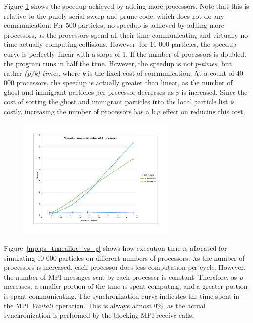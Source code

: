 \documentclass[11pt]{article} %
\begin{document}
Figure \ref{mpips_speedup_vs_p} shows the speedup achieved by adding more processors. Note that this is relative to the purely serial sweep-and-prune code, which does not do any communication. For 500 particles, no speedup is achieved by adding more processors, as the processors spend all their time communicating and virtually no time actually computing collisions. However, for 10 000 particles, the speedup curve is perfectly linear with a slope of 1. If the number of processors is doubled, the program runs in half the time. However, the speedup is not {\em p-times}, but rather {\em (p/k)-times}, where {\em k} is the fixed cost of communication. At a count of 40 000 processors, the speedup is actually greater than linear, as the number of ghost and immigrant particles per processor decreases as {\em p} is increased. Since the cost of sorting the ghost and immigrant particles into the local particle list is costly, increasing the number of processors has a big effect on reducing this cost.

\begin{figure}[!h]
\centering
\includegraphics*[width=0.7\textwidth, viewport= 70 70 730 550]{figures/mpips_speedup_vs_p}
\caption{}
\label{mpips_speedup_vs_p}
\end{figure}

Figure~\ref{mpips_timealloc_vs_p} shows how execution time is allocated for simulating 10 000 particles on different numbers of processors. As the number of processors is increased, each processor does less computation per cycle. However, the number of MPI messages sent by each processor is constant. Therefore, as {\em p} increases, a smaller portion of the time is spent computing, and a greater portion is spent communicating. The synchronization curve indicates the time spent in the MPI {\em Waitall} operation. This is always almost 0\%, as the actual synchronization is performed by the blocking MPI receive calls.
\end{document}
